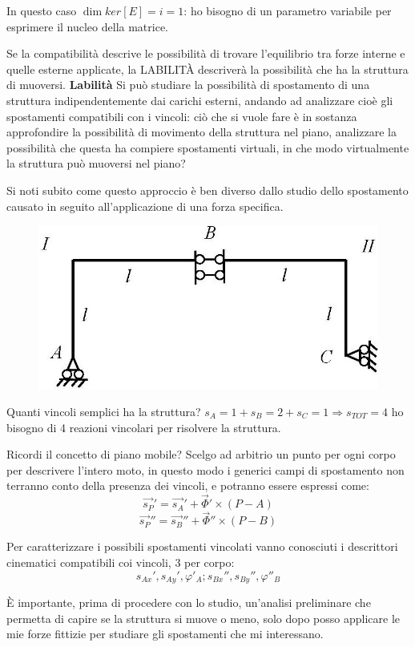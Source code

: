 \documentclass{article}
\begin{document}
\begin{adjustwidth}{2in}{}
In questo caso $\dim ker[E]=i=1$: ho bisogno di un parametro variabile per esprimere il nucleo della matrice. \newline

Se la compatibilità descrive le possibilità di trovare l'equilibrio tra forze interne e quelle esterne applicate, la LABILITÀ descriverà la possibilità che ha la struttura di muoversi. \newline
\newpage
{\Large \textbf{Labilità}} \mbox{} \newline		
Si può studiare la possibilità di spostamento di una struttura indipendentemente dai carichi esterni, andando ad analizzare cioè gli spostamenti compatibili con i vincoli: ciò che si vuole fare è in sostanza approfondire la possibilità di movimento della struttura nel piano, analizzare la possibilità che questa ha compiere spostamenti virtuali, in che modo virtualmente la struttura può muoversi nel piano? 

Si noti subito come questo approccio è ben diverso dallo studio dello spostamento causato in seguito all'applicazione di una forza specifica. 
\begin{figure}[H]
	\centering
	\includegraphics[width=0.4\linewidth]{immagini/1.PARTE2_Pagina_26}
\end{figure}
Quanti vincoli semplici ha la struttura? $s_A = 1 + s_B = 2 + s_C = 1 \Rightarrow s_{TOT} = 4$ ho bisogno di 4 reazioni vincolari per risolvere la struttura. \newline 

Ricordi il concetto di piano mobile? Scelgo ad arbitrio un punto per ogni corpo per descrivere l'intero moto, in questo modo i generici campi di spostamento non terranno conto della presenza dei vincoli, e potranno essere espressi come: 
\[
\vec{s_P}' = \vec{s_A}' + \vec{\Phi}'\times (P-A)
\]
\[
\vec{s_P}'' = \vec{s_B}'' + \vec{\Phi}''\times (P-B)
\]	

Per caratterizzare i possibili spostamenti vincolati vanno conosciuti i descrittori cinematici compatibili coi vincoli, 3 per corpo:
 \[
 s_{Ax}', s_{Ay}', \varphi'_A; s_{Bx}'', s_{By}'', \varphi''_B
 \]

È importante, prima di procedere con lo studio, un'analisi preliminare che permetta di capire se la struttura si muove o meno, solo dopo posso applicare le mie forze fittizie per studiare gli spostamenti che mi interessano. \newline


\end{adjustwidth}
\end{document}
